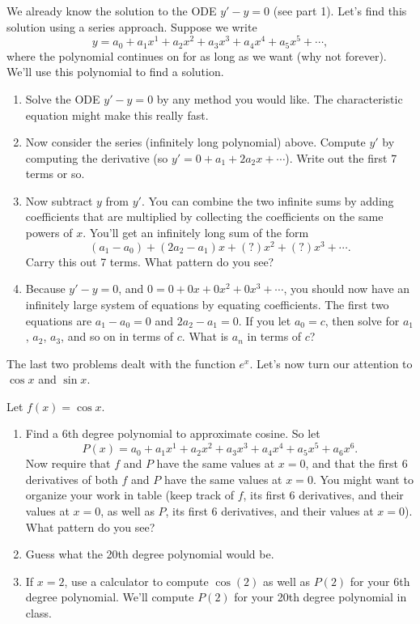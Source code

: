 \begin{problem}
 We already know the solution to the ODE $y'-y=0$ (see part 1).  Let's find this solution using a series approach.
 Suppose we write
 $$y =  a_0+a_1x^1+a_2x^2+a_3x^3+a_4x^4 + a_5x^5 + \cdots,$$
 where the polynomial continues on for as long as we want (why not forever). We'll use this polynomial to find a solution. 
\begin{enumerate}
 \item Solve the ODE $y'-y=0$ by any method you would like. The characteristic equation might make this really fast.
 \item Now consider the series (infinitely long polynomial) above.  Compute $y'$ by computing the derivative (so $y' = 0+a_1+2a_2x+\cdots$). Write out the first 7 terms or so.
 \item Now subtract $y$ from $y'$. You can combine the two infinite sums by adding coefficients that are multiplied by collecting the coefficients on the same powers of $x$. You'll get an infinitely long sum of the form 
$$(a_1-a_0)+(2a_2-a_1)x+(?)x^2+(?)x^3+\cdots . $$
 Carry this out 7 terms.  What pattern do you see?
 \item Because $y'-y=0$, and $0=0+0x+0x^2+0x^3+\cdots$, you should now have an infinitely large system of equations by equating coefficients. The first two equations are $a_1-a_0=0$ and $2a_2-a_1=0$. If you let $a_0=c$, then solve for $a_1$, $a_2$, $a_3$, and so on in terms of $c$. What is $a_n$ in terms of $c$?  
\end{enumerate}

\end{problem}

The last two problems dealt with the function $e^x$.  Let's now turn our attention to $\cos x$ and $\sin x$. 
\begin{problem}
Let $f(x) = \cos x$.  
\begin{enumerate}
 \item Find a 6th degree polynomial to approximate cosine. So let $$P(x) = a_0+a_1x^1+a_2x^2+a_3x^3+a_4x^4 + a_5x^5 +a_6x^6.$$  Now require that $f$ and $P$ have the same values at $x=0$, and that the first 6 derivatives of both $f$ and $P$ have the same values at $x=0$.  You might want to organize your work in table (keep track of $f$, its first 6 derivatives, and their values at $x=0$, as well as $P$, its first 6 derivatives, and their values at $x=0$). What pattern do you see?
 \item Guess what the 20th degree polynomial would be. 
 \item If $x=2$, use a calculator to compute $\cos(2)$ as well as $P(2)$ for your 6th degree polynomial.  We'll compute $P(2)$ for your 20th degree polynomial in class. 
\end{enumerate}
\end{problem}

